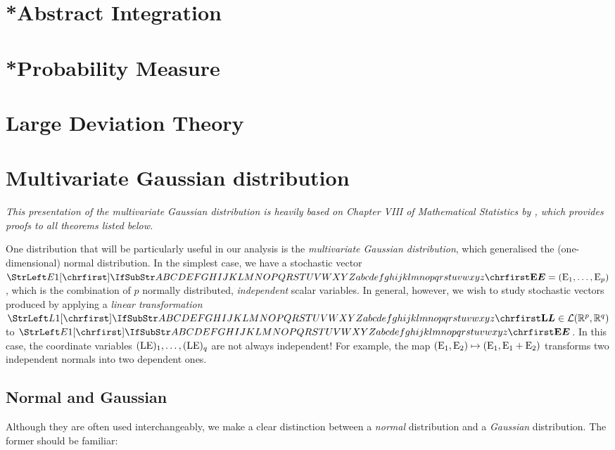 \documentclass[main.tex]{subfiles}
\begin{document}
\section{*Abstract Integration}
\section{*Probability Measure}
\section{Large Deviation Theory}

\section{Multivariate Gaussian distribution}
\emph{This presentation of the multivariate Gaussian distribution is heavily based on Chapter VIII of \emph{Mathematical Statistics} by \cite{Pestman1998}, which provides proofs to all theorems listed below.}

One distribution that will be particularly useful in our analysis is the \emph{multivariate Gaussian distribution}, which generalised the (one-dimensional) normal distribution. In the simplest case, we have a stochastic vector $\mat{E}=(\mel{E}_1, \dots, \mel{E}_p)$, which is the combination of $p$ normally distributed, \emph{independent} scalar variables. In general, however, we wish to study stochastic vectors produced by applying a \emph{linear transformation} $\mat{L} \in \mathcal{L}(\mathbb{R}^p, \mathbb{R}^q)$ to $\mat{E}$. In this case, the coordinate variables $({\mathrm{LE}})_1,\dots,({\mathrm{LE}})_q$ are not always independent! For example, the map $({\mathrm{E}}_1, {\mathrm{E}}_2) \mapsto ({\mathrm{E}}_1, {\mathrm{E}}_1 + {\mathrm{E}}_2)$ transforms two independent normals into two dependent ones.


\subsection{Normal and Gaussian}
Although they are often used interchangeably, we make a clear distinction between a \emph{normal} distribution and a \emph{Gaussian} distribution. The former should be familiar:
\end{document}
